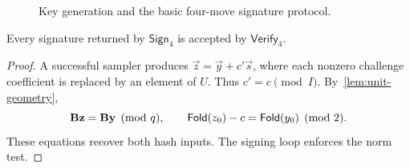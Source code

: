 \begin{figure}[!htbp]
\centering
\begin{minipage}[t]{.49\linewidth}
\centering
{}
\par\medskip
{}
\end{minipage}\hfill
\begin{minipage}[t]{.49\linewidth}
\centering
{}
\end{minipage}
\caption{Key generation and the basic four-move signature protocol.}
\label{fig:unit-signature}
\end{figure}

\begin{lemma}
\label{lem:unit-correctness}
Every signature returned by $\mathsf{Sign}_4$ is accepted by $\mathsf{Verify}_4$.
\end{lemma}
\begin{proof}
A successful sampler produces $\vec z=\vec y+c'\vec s$, where each nonzero challenge coefficient is replaced by an element of $U$. Thus $c'=c\pmod I$. By~\cref{lem:unit-geometry},
\[
 \mathbf{B}\mathbf{z}=\mathbf{B}\mathbf{y}\pmod q,\qquad
 \mathsf{Fold}(z_0)-c=\mathsf{Fold}(y_0)\pmod2.
\]
These equations recover both hash inputs. The signing loop enforces the norm test.
\end{proof}

